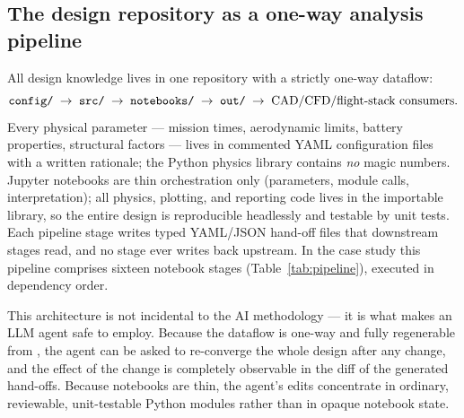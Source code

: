 \subsection{The design repository as a one-way analysis pipeline}
\label{sec:pipeline}

All design knowledge lives in one repository with a strictly one-way
dataflow:
\begin{equation*}
\texttt{config/} \;\rightarrow\; \texttt{src/} \;\rightarrow\;
\texttt{notebooks/} \;\rightarrow\; \texttt{out/} \;\rightarrow\;
\text{CAD/CFD/flight-stack consumers.}
\end{equation*}
Every physical parameter --- mission times, aerodynamic limits,
battery properties, structural factors --- lives in commented YAML
configuration files with a written rationale; the Python physics
library contains \emph{no} magic numbers. Jupyter notebooks are thin
orchestration only (parameters, module calls, interpretation); all
physics, plotting, and reporting code lives in the importable library,
so the entire design is reproducible headlessly and testable by unit
tests. Each pipeline stage writes typed YAML/JSON hand-off files that
downstream stages read, and no stage ever writes back upstream. In the
case study this pipeline comprises sixteen notebook stages
(Table~\ref{tab:pipeline}), executed in dependency order.

This architecture is not incidental to the AI methodology --- it is
what makes an LLM agent safe to employ. Because the dataflow is
one-way and fully regenerable from , the agent can be
asked to re-converge the whole design after any change, and the effect
of the change is completely observable in the diff of the generated
hand-offs. Because notebooks are thin, the agent's edits concentrate
in ordinary, reviewable, unit-testable Python modules rather than in
opaque notebook state.

